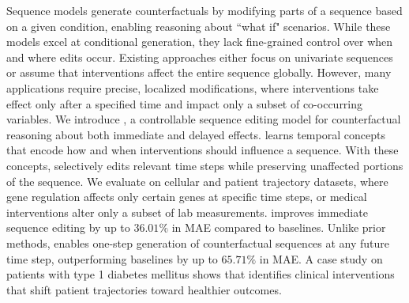 
Sequence models generate counterfactuals by modifying parts of a sequence based on a given condition, enabling reasoning about ``what if" scenarios. While these models excel at conditional generation, they lack fine-grained control over when and where edits occur. Existing approaches either focus on univariate sequences or assume that interventions affect the entire sequence globally. However, many applications require precise, localized modifications, where interventions take effect only after a specified time and impact only a subset of co-occurring variables. We introduce \name, a controllable sequence editing model for counterfactual reasoning about both immediate and delayed effects. \name learns temporal concepts that encode how and when interventions should influence a sequence. With these concepts, \name selectively edits relevant time steps while preserving unaffected portions of the sequence. We evaluate \name on cellular and patient trajectory datasets, where gene regulation affects only certain genes at specific time steps, or medical interventions alter only a subset of lab measurements. \name improves immediate sequence editing by up to $36.01\%$ in MAE compared to baselines. Unlike prior methods, \name enables one-step generation of counterfactual sequences at any future time step, outperforming baselines by up to $65.71\%$ in MAE. A case study on patients with type 1 diabetes mellitus shows that \name identifies clinical interventions that shift patient trajectories toward healthier outcomes.


\vspace{-0.7em}